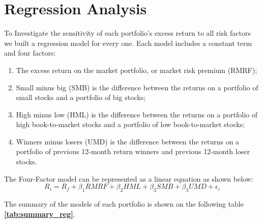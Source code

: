 \documentclass[11pt]{article}
\begin{document}
\section{Regression Analysis}
To Investigate the sensitivity of each portfolio’s excess return to all risk factors we built a regression model for every one. Each model includes a constant 
term and four factors:
\begin{enumerate}
    \item The excess return on the market portfolio, or market risk premium (RMRF);
    \item Small minus big (SMB) is the difference between the returns on a portfolio of small stocks and a portfolio of big stocks;
    \item High minus low (HML) is the difference between the returns on a portfolio of high book-to-market stocks and a portfolio of low book-to-market stocks;
    \item Winners minus losers (UMD) is the difference between the returns on a portfolio of previous 12-month return winners and previous 12-month loser stocks.
\end{enumerate}

The Four-Factor model can be represented as a linear equation as shown below:
\begin{equation}
    R_i = R_f + \beta_1RMRF + \beta_2HML + \beta_3SMB + \beta_3UMD + \epsilon_i
    \label{eq: ffc_eq} 
\end{equation}

The summary of the models of each portfolio is shown on the following table \textbf{\ref{tab:summary_reg}}.
\end{document}
